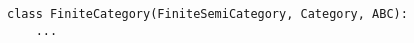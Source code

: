 \par\begin{minipage}{60ex}
\begin{verbatim}
class FiniteCategory(FiniteSemiCategory, Category, ABC):
    ...
\end{verbatim}
\end{minipage}\par